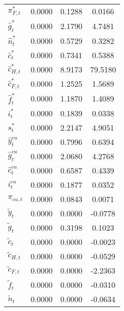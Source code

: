 \begin{center}
\begin{longtable}{lccc}
${\pi_{F,t}^*}            $	 & 	       0.0000	 & 	       0.1288	 & 	       0.0166 \\ 
${\hat g_t^*}             $	 & 	       0.0000	 & 	       2.1790	 & 	       4.7481 \\ 
${\hat n_t^*}             $	 & 	       0.0000	 & 	       0.5729	 & 	       0.3282 \\ 
${\hat c_t^*}             $	 & 	       0.0000	 & 	       0.7341	 & 	       0.5388 \\ 
${\hat c_{H,t}^*}         $	 & 	       0.0000	 & 	       8.9173	 & 	      79.5180 \\ 
${\hat c_{F,t}^*}         $	 & 	       0.0000	 & 	       1.2525	 & 	       1.5689 \\ 
${\hat f_t^*}             $	 & 	       0.0000	 & 	       1.1870	 & 	       1.4089 \\ 
${i_t^*}                  $	 & 	       0.0000	 & 	       0.1839	 & 	       0.0338 \\ 
${s_t^*}                  $	 & 	       0.0000	 & 	       2.2147	 & 	       4.9051 \\ 
${\hat y_t^{cu}}          $	 & 	       0.0000	 & 	       0.7996	 & 	       0.6394 \\ 
${\hat g_t^{cu}}          $	 & 	       0.0000	 & 	       2.0680	 & 	       4.2768 \\ 
${\hat c_t^{cu}}          $	 & 	       0.0000	 & 	       0.6587	 & 	       0.4339 \\ 
${i_t^{cu}}               $	 & 	       0.0000	 & 	       0.1877	 & 	       0.0352 \\ 
${\pi_{cu,t}}             $	 & 	       0.0000	 & 	       0.0843	 & 	       0.0071 \\ 
${\tilde y_t}             $	 & 	       0.0000	 & 	       0.0000	 & 	      -0.0778 \\ 
${\tilde g_t}             $	 & 	       0.0000	 & 	       0.3198	 & 	       0.1023 \\ 
${\tilde c_t}             $	 & 	       0.0000	 & 	       0.0000	 & 	      -0.0023 \\ 
${\tilde c_{H,t}}         $	 & 	       0.0000	 & 	       0.0000	 & 	      -0.0529 \\ 
${\tilde c_{F,t}}         $	 & 	       0.0000	 & 	       0.0000	 & 	      -2.2363 \\ 
${\tilde f_t}             $	 & 	       0.0000	 & 	       0.0000	 & 	      -0.0310 \\ 
${\tilde n_t}             $	 & 	       0.0000	 & 	       0.0000	 & 	      -0.0634 \\ 

\end{longtable}
\end{center}
